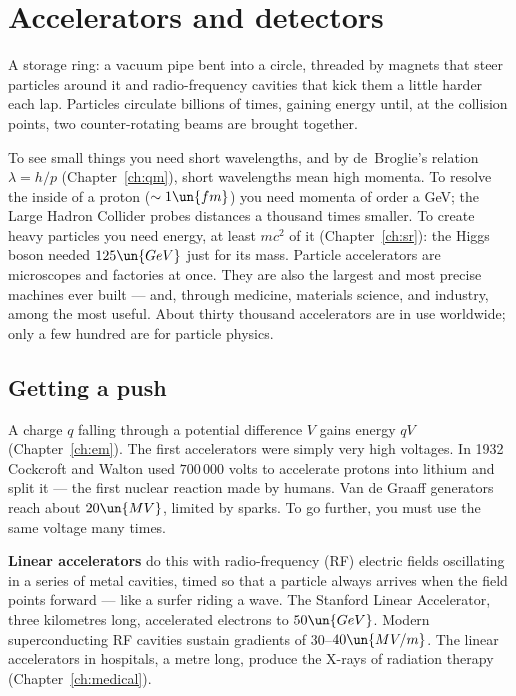 \chapter{Accelerators and detectors}
\label{ch:accel}



\begin{prototype}
A storage ring: a vacuum pipe bent into a circle, threaded by magnets that steer particles around it and radio-frequency cavities that kick them a little harder each lap. Particles circulate billions of times, gaining energy until, at the collision points, two counter-rotating beams are brought together.
\end{prototype}

To see small things you need short wavelengths, and by de~Broglie's relation $\lambda = h/p$ (Chapter~\ref{ch:qm}), short wavelengths mean high momenta. To resolve the inside of a proton ($\sim1\un{fm}$) you need momenta of order a GeV; the Large Hadron Collider probes distances a thousand times smaller. To create heavy particles you need energy, at least $mc^2$ of it (Chapter~\ref{ch:sr}): the Higgs boson needed $125\un{GeV}$ just for its mass. Particle accelerators are microscopes and factories at once. They are also the largest and most precise machines ever built --- and, through medicine, materials science, and industry, among the most useful. About thirty thousand accelerators are in use worldwide; only a few hundred are for particle physics.

\section{Getting a push}

A charge $q$ falling through a potential difference $V$ gains energy $qV$ (Chapter~\ref{ch:em}). The first accelerators were simply very high voltages. In 1932 Cockcroft and Walton used $700\,000$ volts to accelerate protons into lithium and split it --- the first nuclear reaction made by humans. Van de Graaff generators reach about $20\un{MV}$, limited by sparks. To go further, you must use the same voltage many times.

\textbf{Linear accelerators} do this with radio-frequency (RF) electric fields oscillating in a series of metal cavities, timed so that a particle always arrives when the field points forward --- like a surfer riding a wave. The Stanford Linear Accelerator, three kilometres long, accelerated electrons to $50\un{GeV}$. Modern superconducting RF cavities sustain gradients of $30$--$40\un{MV/m}$. The linear accelerators in hospitals, a metre long, produce the X-rays of radiation therapy (Chapter~\ref{ch:medical}).

